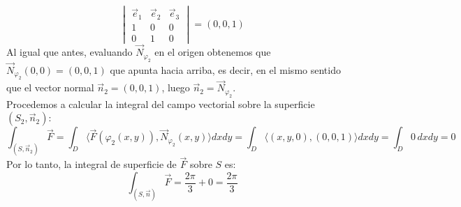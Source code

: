 {\[\begin{vmatrix}
            \vec{e}_1 & \vec{e}_2 & \vec{e}_3 \\
            1         & 0         & 0         \\
            0         & 1         & 0
        \end{vmatrix}
        = (0, 0, 1)
    \]
    Al igual que antes, evaluando $\vec{N}_{\varphi_2}$ en el origen obtenemos que
    $\vec{N}_{\varphi_2}(0,0) = (0,0,1)$ que apunta hacia arriba, es decir, en el mismo
    sentido que el vector normal $\vec{n}_2 = (0,0,1)$, luego $\vec{n}_2 =
        \vec{N}_{\varphi_2}$.\\ Procedemos a calcular la integral del campo vectorial
    sobre la superficie $(S_2, \vec{n}_2)$:
    \[
        \int_{(S, \vec{n}_2)} \vec{F} = \int_{D} \langle \vec{F}(\varphi_2(x,y)), \vec{N}_{\varphi_2}(x,y) \rangle dx dy = \int_{D} \langle (x,y,0), (0,0,1) \rangle dx dy = \int_{D} 0 \, dx dy = 0
    \]
    Por lo tanto, la integral de superficie de $\vec{F}$ sobre $S$ es:
    \[
        \int_{(S, \vec{n})} \vec{F} = \frac{2\pi}{3} + 0 = \frac{2\pi}{3}
    \]
}


